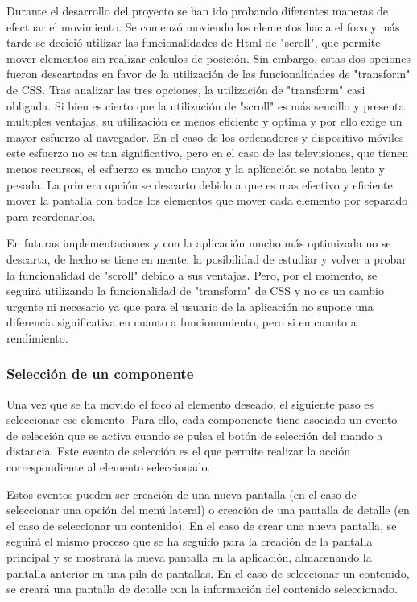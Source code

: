     
Durante el desarrollo del proyecto se han ido probando diferentes maneras de efectuar el movimiento. Se comenzó moviendo los 
elementos hacia el foco y más tarde se decició utilizar las funcionalidades de Html de "scroll", que permite mover elementos
sin realizar calculos de posición. Sin embargo, estas dos opciones fueron descartadas en favor de la utilización de 
las funcionalidades de "transform" de CSS. Tras analizar las tres opciones, la utilización de "transform" casi obligada. Si 
bien es cierto que la utilización de "scroll" es más sencillo y presenta multiples ventajas, su utilización es menos eficiente
y optima y por ello exige un mayor esfuerzo al navegador. En el caso de los ordenadores y dispositivo móviles este esfuerzo
no es tan significativo, pero en el caso de las televisiones, que tienen menos recursos, el esfuerzo es mucho mayor y la aplicación
se notaba lenta y pesada. La primera opción se descarto debido a que es mas efectivo y eficiente mover la pantalla con todos los elementos
que mover cada elemento por separado para reordenarlos.

En futuras implementaciones y con la aplicación mucho más optimizada no se descarta, de hecho se tiene en mente, la posibilidad de 
estudiar y volver a probar la funcionalidad de "scroll" debido a sus ventajas. Pero, por el momento, se seguirá utilizando la funcionalidad
de "transform" de CSS y no es un cambio urgente ni necesario ya que para el usuario de la aplicación no supone una diferencia significativa
en cuanto a funcionamiento, pero si en cuanto a rendimiento.


\subsubsection{Selección de un componente}
\label{sec:seleccion_componente}

Una vez que se ha movido el foco al elemento deseado, el siguiente paso es seleccionar ese elemento. Para ello, cada componenete tiene asociado un evento de selección
que se activa cuando se pulsa el botón de selección del mando a distancia. Este evento de selección es el que permite realizar la acción correspondiente al elemento
seleccionado. 

Estos eventos pueden ser creación de una nueva pantalla (en el caso de seleccionar una opción del menú lateral) o creación de una pantalla de detalle
(en el caso de seleccionar un contenido). En el caso de crear una nueva pantalla, se seguirá el mismo proceso que se ha seguido para la creación de la pantalla principal
y se mostrará la nueva pantalla en la aplicación, almacenando la pantalla anterior en una pila de pantallas. En el caso de seleccionar un contenido, se creará una pantalla
de detalle con la información del contenido seleccionado.

